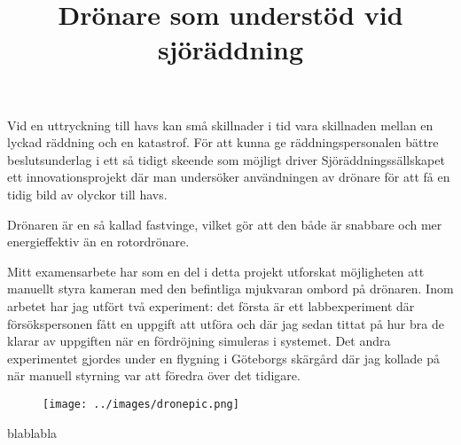\documentclass{popsci}
\title{Drönare som understöd vid sjöräddning}
\begin{document}

{\noindent Vid en uttryckning till havs kan små skillnader i tid vara skillnaden mellan en lyckad räddning och en katastrof. För att kunna ge räddningspersonalen bättre beslutsunderlag i ett så tidigt skeende som möjligt driver Sjöräddningssällskapet ett innovationsprojekt där man undersöker användningen av drönare för att få en tidig bild av olyckor till havs.

Drönaren är en så kallad fastvinge, vilket gör att den både är snabbare och mer energieffektiv än en rotordrönare.

Mitt examensarbete har som en del i detta projekt utforskat möjligheten att manuellt styra kameran med den befintliga mjukvaran ombord på drönaren. Inom arbetet har jag utfört två experiment: det första är ett labbexperiment där försökspersonen fått en uppgift att utföra och där jag sedan tittat på hur bra de klarar av uppgiften när en fördröjning simuleras i systemet. Det andra experimentet gjordes under en flygning i Göteborgs skärgård där jag kollade på när manuell styrning var att föredra över det tidigare.

\begin{figure}[!bth] %
\texttt{[image: ../images/dronepic.png]} 
\end{figure}

blablabla
}

\end{document}
